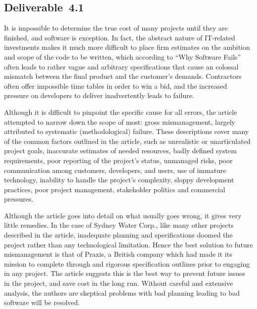 
\renewcommand{\courseNumber}{cs105a}
\renewcommand{\courseTitle}{Software Engineering to Scale}


\renewcommand{\assignmentType}{Deliverable}
\renewcommand{\assignmentNum}{4.1}
\renewcommand{\assignmentDueDate}{1/26/2015}



\begin{center}\section*{\assignmentType\ \assignmentNum}\end{center}
	It is impossible to determine the true cost of many projects until they are finished, and software is exception. In fact, the abstract nature of IT-related investments makes it much more difficult to place firm estimates on the ambition and scope of the code to be written, which according to ``Why Software Fails'' often leads to rather vague and arbitrary specifications that cause an colossal mismatch between the final product and the customer's demands. Contractors often offer impossible time tables in order to win a bid, and the increased pressure on developers to deliver inadvertently leads to failure.

	Although it is difficult to pinpoint the specific cause for all errors, the article attempted to narrow down the scope of most: gross mismanagement, largely attributed to systematic (methodological) failure. These descriptions cover many of the common factors outlined in the article, such as unrealistic or unarticulated project goals, inaccurate estimates of needed resources, badly defined system requirements, poor reporting of the project's status, unmanaged risks, poor communication among customers, developers, and users, use of immature technology, inability to handle the project's complexity, sloppy development practices, poor project management, stakeholder politics and commercial pressures.

	Although the article goes into detail on what usually goes wrong, it gives very little remedies. In the case of Sydney Water Corp., like many other projects described in the article, inadequate planning and specifications doomed the project rather than any technological limitation. Hence the best solution to future mismanagement is that of Praxis, a British company which had made it its mission to complete through and rigorous specification outlines prior to engaging in any project. The article suggests this is the best way to prevent future issues in the project, and save cost in the long run. Without careful and extensive analysis, the authors are skeptical problems with bad planning leading to bad software will be resolved.

